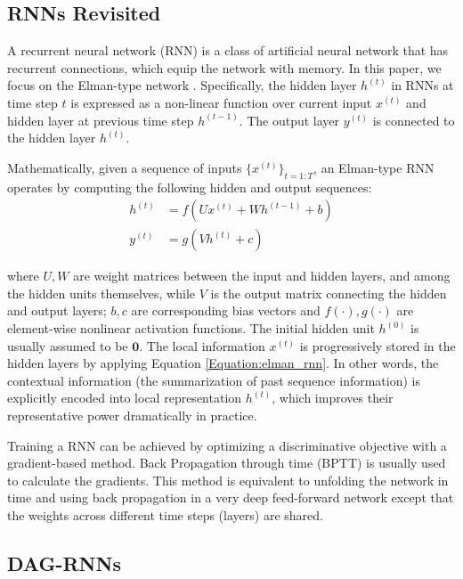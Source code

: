 \documentclass[10pt,twocolumn,letterpaper]{article}
\begin{document}
\subsection{RNNs Revisited}
\label{Section:1d_rnn}
A recurrent neural network (RNN) is a class of artificial neural network that has recurrent connections, which equip the network with memory.
In this paper, we focus on the Elman-type network \cite{elman1990finding}.
Specifically, the hidden layer $h^{(t)}$ in RNNs at time step $t$ is expressed as a non-linear function over current input $x^{(t)}$ and hidden layer at previous time step $h^{(t-1)}$. The output layer $y^{(t)}$ is connected to the hidden layer $h^{(t)}$.


Mathematically, given a sequence of inputs $\{ x^{(t)} \}_{t=1:T}$, an Elman-type RNN operates by computing the following hidden and output sequences:
\begin{equation}
\begin{aligned}
 h^{(t)} &= f(Ux^{(t)} + Wh^{(t-1)} + b) \\
 y^{(t)} &= g(Vh^{(t)} + c)
\end{aligned}
\label{Equation:elman_rnn}
\end{equation}

where $U, W$ are weight matrices between the input and hidden layers, and among the hidden units themselves, while $V$ is the output matrix connecting the hidden and output layers; $b, c$ are corresponding bias vectors and $f(\cdot), g(\cdot)$ are element-wise nonlinear activation functions. The initial hidden unit $h^{(0)}$ is usually assumed to be $\textbf{0}$. The local information $x^{(t)}$ is progressively stored in the hidden layers by applying Equation \ref{Equation:elman_rnn}. In other words, the contextual information (the summarization of past sequence information) is explicitly encoded into local representation $h^{(t)}$, which improves their representative power dramatically in practice.

Training a RNN can be achieved by optimizing a discriminative objective with a gradient-based method. Back Propagation through time (BPTT) \cite{werbos1990backpropagation} is usually used to calculate the gradients. This method is equivalent to unfolding the network in time and using back propagation in a very deep feed-forward network except that the weights across different time steps (layers) are shared.

\subsection{DAG-RNNs}
\label{Section:dag_rnn}
\end{document}

